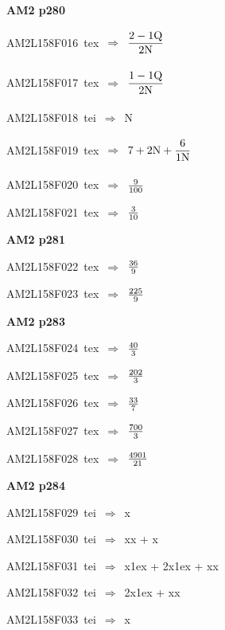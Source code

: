 \par\vfill\eject
{\bf\hfill AM2 p280\hfill\hbox{}}\par\bigskip
{\sixrm AM2L158F016\ {\sixit tex}\ }$\Rightarrow$\ ${\displaystyle\strut {2 - 1{\rm Q}}\over \displaystyle\strut 2{\rm N}}$\par\smallskip
{\sixrm AM2L158F017\ {\sixit tex}\ }$\Rightarrow$\ ${\displaystyle\strut {1 - 1{\rm Q}}\over \displaystyle\strut 2{\rm N}}$\par\smallskip
{\sixrm AM2L158F018\ {\sixit tei}\ }$\Rightarrow$\ N\par\smallskip
{\sixrm AM2L158F019\ {\sixit tex}\ }$\Rightarrow$\ $7 + 2{\rm N} + {\displaystyle\strut 6\over \displaystyle\strut 1{\rm N}}$\par\smallskip
{\sixrm AM2L158F020\ {\sixit tex}\ }$\Rightarrow$\ ${9\over 100}$\par\smallskip
{\sixrm AM2L158F021\ {\sixit tex}\ }$\Rightarrow$\ ${3\over 10}$\par\smallskip

\par\vfill\eject
{\bf\hfill AM2 p281\hfill\hbox{}}\par\bigskip
{\sixrm AM2L158F022\ {\sixit tex}\ }$\Rightarrow$\ ${36\over 9}$\par\smallskip
{\sixrm AM2L158F023\ {\sixit tex}\ }$\Rightarrow$\ ${225\over 9}$\par\smallskip

\par\vfill\eject
{\bf\hfill AM2 p283\hfill\hbox{}}\par\bigskip
{\sixrm AM2L158F024\ {\sixit tex}\ }$\Rightarrow$\ ${40\over 3}$\par\smallskip
{\sixrm AM2L158F025\ {\sixit tex}\ }$\Rightarrow$\ ${202\over 3}$\par\smallskip
{\sixrm AM2L158F026\ {\sixit tex}\ }$\Rightarrow$\ ${33\over 7}$\par\smallskip
{\sixrm AM2L158F027\ {\sixit tex}\ }$\Rightarrow$\ ${700\over 3}$\par\smallskip
{\sixrm AM2L158F028\ {\sixit tex}\ }$\Rightarrow$\ ${4901\over 21}$\par\smallskip

\par\vfill\eject
{\bf\hfill AM2 p284\hfill\hbox{}}\par\bigskip
{\sixrm AM2L158F029\ {\sixit tei}\ }$\Rightarrow$\ {\tenit x}\par\smallskip
{\sixrm AM2L158F030\ {\sixit tei}\ }$\Rightarrow$\ {\tenit xx} + {\tenit x}\par\smallskip
{\sixrm AM2L158F031\ {\sixit tei}\ }$\Rightarrow$\ {\tenit x}\raise1ex\hbox{} + 2{\tenit x}\raise1ex\hbox{} + {\tenit xx}\par\smallskip
{\sixrm AM2L158F032\ {\sixit tei}\ }$\Rightarrow$\ 2{\tenit x}\raise1ex\hbox{} + {\tenit xx}\par\smallskip
{\sixrm AM2L158F033\ {\sixit tei}\ }$\Rightarrow$\ {\tenit x}\par\smallskip

